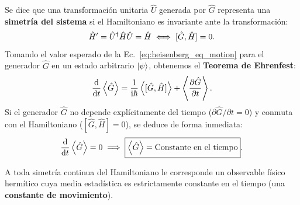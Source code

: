 Se dice que una transformación unitaria $\hat{U}$ generada por $\hat{G}$ representa una \textbf{simetría del sistema} si el Hamiltoniano es invariante ante la transformación:
\begin{equation}
    \hat{H}' = \hat{U}^\dagger \hat{H} \hat{U} = \hat{H} \iff [\hat{G}, \hat{H}] = 0.
    \label{eq:hamiltonian_invariance}
\end{equation}
Tomando el valor esperado de la Ec.~\eqref{eq:heisenberg_eq_motion} para el generador $\hat{G}$ en un estado arbitrario $\left| \psi \right\rangle$, obtenemos el \textbf{Teorema de Ehrenfest}:
\begin{equation}
    \frac{\mathrm{d}}{\mathrm{d} t}\left\langle \hat{G} \right\rangle = \frac{1}{\mathrm{i}\hbar}\left\langle [\hat{G}, \hat{H}] \right\rangle + \left\langle \frac{\partial\hat{G}}{\partial t} \right\rangle.
    \label{eq:ehrenfest_theorem}
\end{equation}
Si el generador $\hat{G}$ no depende explícitamente del tiempo ($\partial\hat{G}/\partial t = 0$) y conmuta con el Hamiltoniano ($[\hat{G}, \hat{H}] = 0$), se deduce de forma inmediata:
\begin{equation}
    \frac{\mathrm{d}}{\mathrm{d} t}\left\langle \hat{G} \right\rangle = 0 \implies \boxed{\left\langle \hat{G} \right\rangle = \text{Constante en el tiempo}}.
\end{equation}

\begin{teoremabox}
    A toda simetría continua del Hamiltoniano le corresponde un observable físico hermítico cuya media estadística es estrictamente constante en el tiempo (una \textbf{constante de movimiento}).
\end{teoremabox}

